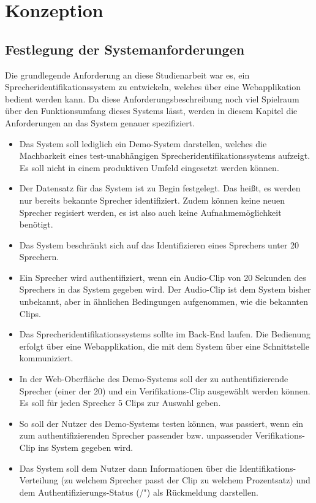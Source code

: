 \section{Konzeption}

\subsection{Festlegung der Systemanforderungen}

Die grundlegende Anforderung an diese Studienarbeit war es, ein Sprecheridentifikationssystem zu entwickeln, welches über eine Webapplikation bedient werden kann.
Da diese Anforderungsbeschreibung noch viel Spielraum über den Funktionsumfang dieses Systems lässt, werden in diesem Kapitel die Anforderungen an das System genauer spezifiziert.


\begin{itemize}
    \item Das System soll lediglich ein Demo-System darstellen, welches die Machbarkeit eines test-unabhängigen Sprecheridentifikationssystems aufzeigt. Es soll nicht in einem produktiven Umfeld eingesetzt werden können.
    \item Der Datensatz für das System ist zu Begin festgelegt. Das heißt, es werden nur bereits bekannte Sprecher identifiziert. Zudem können keine neuen Sprecher regisiert werden, es ist also auch keine Aufnahmemöglichkeit benötigt.
    \item Das System beschränkt sich auf das Identifizieren eines Sprechers unter 20 Sprechern.
    \item Ein Sprecher wird authentifiziert, wenn ein Audio-Clip von 20 Sekunden des Sprechers in das System gegeben wird. Der Audio-Clip ist dem System bisher unbekannt, aber in ähnlichen Bedingungen aufgenommen, wie die bekannten Clips.
    \item Das Sprecheridentifikationssystems sollte im Back-End laufen. Die Bedienung erfolgt über eine Webapplikation, die mit dem System über eine Schnittstelle kommuniziert.
    \item In der Web-Oberfläche des Demo-Systems soll der zu authentifizierende Sprecher (einer der 20) und ein Verifikations-Clip ausgewählt werden können. Es soll für jeden Sprecher 5 Clips zur Auswahl geben.
    \item So soll der Nutzer des Demo-Systems testen können, was passiert, wenn ein zum authentifizierenden Sprecher passender bzw. unpassender Verifikations-Clip ins System gegeben wird.
    \item Das System soll dem Nutzer dann Informationen über die Identifikations-Verteilung (zu welchem Sprecher passt der Clip zu welchem Prozentsatz) und dem Authentifizierungs-Status (/") als Rückmeldung darstellen.
\end{itemize}